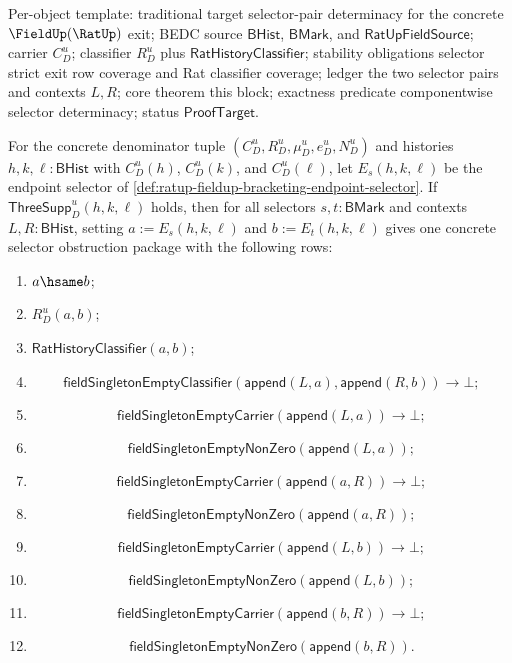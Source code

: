 
Per-object template: traditional target selector-pair determinacy for the
concrete $\FieldUp(\RatUp)$ exit; BEDC source $\mathsf{BHist}$,
$\mathsf{BMark}$, and $\mathsf{RatUpFieldSource}$; carrier $C_D^u$; classifier
$R_D^u$ plus $\mathsf{RatHistoryClassifier}$; stability obligations selector
strict exit row coverage and Rat classifier coverage; ledger the two selector
pairs and contexts $L,R$; core theorem this block; exactness predicate
componentwise selector determinacy; status $\mathsf{ProofTarget}$.

\begin{theorem}
\label{thm:ratup-fieldup-bracketing-selector-complete-obstruction-package}
For the concrete denominator tuple $(C_D^u,R_D^u,\mu_D^u,e_D^u,N_D^u)$ and
histories $h,k,\ell:\mathsf{BHist}$ with $C_D^u(h)$, $C_D^u(k)$, and
$C_D^u(\ell)$, let $E_s(h,k,\ell)$ be the endpoint selector of
\autoref{def:ratup-fieldup-bracketing-endpoint-selector}. If
$\mathsf{ThreeSupp}_D^u(h,k,\ell)$ holds, then for all selectors
$s,t:\mathsf{BMark}$ and contexts $L,R:\mathsf{BHist}$, setting
$a:=E_s(h,k,\ell)$ and $b:=E_t(h,k,\ell)$ gives one concrete selector
obstruction package with the following rows:
\begin{enumerate}
  \item $a\hsame b$;
  \item $R_D^u(a,b)$;
  \item $\mathsf{RatHistoryClassifier}(a,b)$;
  \item
  $$
  \mathsf{fieldSingletonEmptyClassifier}
  (\mathsf{append}(L,a),\mathsf{append}(R,b))\to\bot;
  $$
  \item
  $$
  \mathsf{fieldSingletonEmptyCarrier}(\mathsf{append}(L,a))\to\bot;
  $$
  \item
  $$
  \mathsf{fieldSingletonEmptyNonZero}(\mathsf{append}(L,a));
  $$
  \item
  $$
  \mathsf{fieldSingletonEmptyCarrier}(\mathsf{append}(a,R))\to\bot;
  $$
  \item
  $$
  \mathsf{fieldSingletonEmptyNonZero}(\mathsf{append}(a,R));
  $$
  \item
  $$
  \mathsf{fieldSingletonEmptyCarrier}(\mathsf{append}(L,b))\to\bot;
  $$
  \item
  $$
  \mathsf{fieldSingletonEmptyNonZero}(\mathsf{append}(L,b));
  $$
  \item
  $$
  \mathsf{fieldSingletonEmptyCarrier}(\mathsf{append}(b,R))\to\bot;
  $$
  \item
  $$
  \mathsf{fieldSingletonEmptyNonZero}(\mathsf{append}(b,R)).
  $$
\end{enumerate}
\end{theorem}
